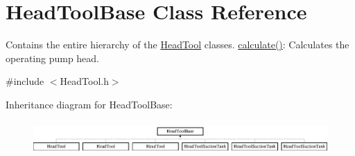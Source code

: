 \hypertarget{class_head_tool_base}{}\section{Head\+Tool\+Base Class Reference}
\label{class_head_tool_base}


Contains the entire hierarchy of the \hyperlink{class_head_tool}{Head\+Tool} classes. \hyperlink{class_head_tool_base_ab8df8f908827ce45dc5e769ea0e10f0b}{calculate()}\+: Calculates the operating pump head.  




{\ttfamily \#include $<$Head\+Tool.\+h$>$}

Inheritance diagram for Head\+Tool\+Base\+:\begin{figure}[H]
\begin{center}
\leavevmode
\includegraphics[height=1.305361cm]{d5/dc5/class_head_tool_base}
\end{center}
\end{figure}
